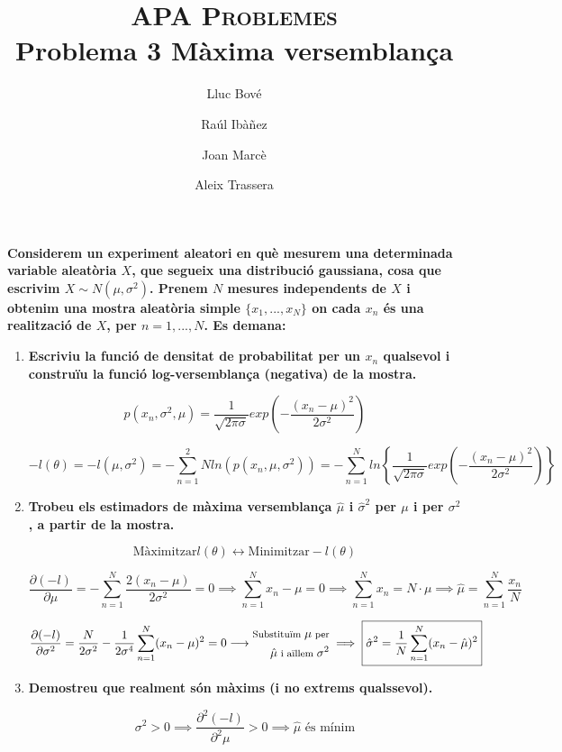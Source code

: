 \documentclass[a4paper]{article}
\title{\textsc{APA Problemes} \\ Problema 3 Màxima versemblança}
\author{Lluc Bové \and Raúl Ibàñez \and Joan Marcè \and Aleix Trassera}
\date{}
\begin{document}
\maketitle

\textbf{Considerem un experiment aleatori en què mesurem una determinada variable aleatòria $X$, que segueix una distribució gaussiana, cosa que escrivim $X \sim N(\mu, \sigma^2)$. Prenem $N$ mesures independents de $X$ i obtenim una mostra aleatòria simple $\{x_1, ..., x_N\}$ on cada $x_n$ és una realització de $X$, per $n=1,...,N$. Es demana:}

\begin{enumerate}
\item \textbf{Escriviu la funció de densitat de probabilitat per un $x_n$ qualsevol i construïu la funció log-versemblança (negativa) de la mostra.}

$$p(x_n, \sigma^2, \mu) = \frac{1}{\sqrt{2\pi\sigma}} exp\left(-\frac{(x_n - \mu)^2}{2\sigma^2}\right)$$

$$ -l(\theta) = -l(\mu,\sigma^2) = -\sum_{n=1}^2N ln(p(x_n, \mu, \sigma^2)) = - \sum_{n=1}^N ln \left\{\frac{1}{\sqrt{2\pi\sigma}} exp\left(-\frac{(x_n - \mu)^2}{2\sigma^2}\right) \right\}$$

\item \textbf{Trobeu els estimadors de màxima versemblança $\hat{\mu}$ i $\hat{\sigma}^2$ per $\mu$ i per $\sigma^2$, a partir de la mostra.}

$$\text{Màximitzar} l(\theta) \leftrightarrow \text{Minimitzar} -l(\theta)$$

$$ \frac{\partial(-l)}{\partial\mu} = -\sum_{n=1}^N \frac{2(x_n - \mu)}{2\sigma^2} = 0 \implies 
\sum_{n=1}^N x_n - \mu = 0 \implies \sum_{n=1}^N x_n = N·\mu \implies \boxed{\hat{\mu} = \sum_{n=1}^N \frac{x_n}{N}}$$ 

$$
\frac{\partial(-l)}{\partial\sigma^2} = \frac{N}{2\sigma^2} - \frac{1}{2\sigma^4}\sum_{n=1}^N (x_n - \mu)^2 = 0 \longrightarrow
\begin{aligned}
\footnotesize
\text{Substituïm } \mu \text{ per}\\
\footnotesize
\hat{\mu} \text{ i aïllem } \sigma^2 
\end{aligned} 
\implies \boxed{\hat{\sigma}^2 = \frac{1}{N} \sum_{n=1}^N (x_n - \hat{\mu})^2} $$

\item \textbf{Demostreu que realment són màxims (i no extrems qualssevol).}

$$ \sigma^2 > 0 \implies \frac{\partial^2(-l)}{\partial^2\mu} > 0 \implies \hat{\mu} \text{ és mínim}$$


\end{enumerate}
\end{document}
